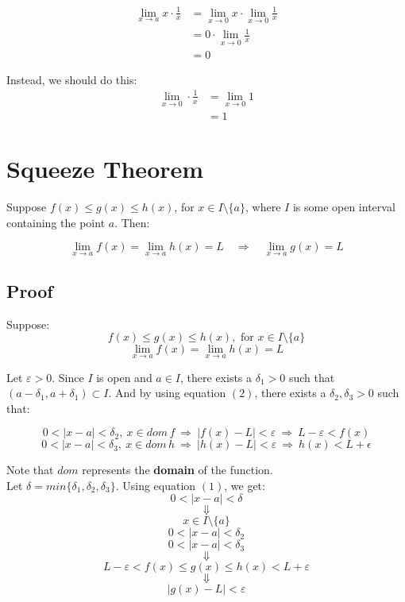 \documentclass[11pt]{article}
\begin{document}
\begin{align*}
\lim_{x \rightarrow a} x \cdot \frac{1}{x} &= \lim_{x \rightarrow 0} x \cdot \lim_{x \rightarrow 0} \frac{1}{x} \\
&= 0 \cdot \lim_{x \rightarrow 0} \frac{1}{x} \\
&= 0
\end{align*}

Instead, we should do this:
\begin{align*}
\lim_{x \rightarrow 0} \cdot \frac{1}{x} &= \lim_{x \rightarrow 0} 1 \\
&= 1
\end{align*}


\section{Squeeze Theorem}
\label{sec:org18cef31}
Suppose \(f(x) \leq g(x) \leq h(x)\), for \(x \in I \setminus \{a\}\), where \(I\) is some open interval containing the point \(a\). Then:

\[\lim_{x \rightarrow a} f(x) = \lim_{x \rightarrow a} h(x) = L \quad \Rightarrow \quad \lim_{x \rightarrow a} g(x) = L\]

\newpage

\subsection{Proof}
\label{sec:orgc999caa}

Suppose:
\[f(x) \leq g(x) \leq h(x), \text{ for } x \in I \setminus \{a\} \tag{1}\]
\[\lim_{x \rightarrow a}f(x) = \lim_{x \rightarrow a}h(x) = L \tag{2}\]

Let \(\varepsilon > 0\). Since \(I\) is open and \(a \in I\), there exists a \(\delta_1 > 0\) such that \((a - \delta_1, a + \delta_1) \subset I\). And by using equation \((2)\), there exists a \(\delta_2, \delta_3 > 0\) such that:

\[0 < |x - a| < \delta_2, \ x \in dom \, f \ \Rightarrow \ |f(x) - L| < \varepsilon \ \Rightarrow \ L - \varepsilon < f(x)\]
\[0 < |x - a| < \delta_3, \ x \in dom \, h \ \Rightarrow \ |h(x) - L| < \varepsilon \ \Rightarrow \ h(x) < L + \epsilon\]

Note that \(dom\) represents the \textbf{domain} of the function.
\\[0pt]

Let \(\delta = min \{\delta_1, \delta_2, \delta_3\}\). Using equation \((1)\), we get:
\[0 < |x - a| < \delta\]
\[\Downarrow\]
\[x \in I \setminus \{a\}\]
\[0 < |x - a| < \delta_2\]
\[0 < |x - a| < \delta_3\]
\[\Downarrow\]
\[L - \varepsilon < f(x) \leq g(x) \leq h(x) < L + \varepsilon\]
\[\Downarrow\]
\[|g(x) - L| < \varepsilon\]
\end{document}
